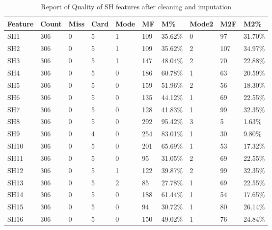 \documentclass[10pt,letterpaper,oneside]{article}
\begin{document}
	\begin{table}[ht]
		\centering
		\caption{Report of Quality of SH features after cleaning and imputation}
		\label{tab-report-of-quality-of-sh-features}
		\begin{tabular}{llllp{1.9cm}lllll}
			\hline
			\textbf{Feature} & \textbf{Count} & \textbf{Miss} & \textbf{Card} & \textbf{Mode}  & \textbf{MF} & \textbf{M\%} & \textbf{Mode2} & \textbf{M2F} & \textbf{M2\%} \\ \hline 
			SH1     & 306   & 0    & 5    & 1    & 109      & 35.62\%  & 0     & 97        & 31.70\%   \\ 
			SH2     & 306   & 0    & 5    & 1    & 109      & 35.62\%  & 2     & 107       & 34.97\%   \\ 
			SH3     & 306   & 0    & 5    & 1    & 147      & 48.04\%  & 2     & 70        & 22.88\%   \\ 
			SH4     & 306   & 0    & 5    & 0    & 186      & 60.78\%  & 1     & 63        & 20.59\%   \\ 
			SH5     & 306   & 0    & 5    & 0    & 159      & 51.96\%  & 2     & 56        & 18.30\%   \\ 
			SH6     & 306   & 0    & 5    & 0    & 135      & 44.12\%  & 1     & 69        & 22.55\%   \\ 
			SH7     & 306   & 0    & 5    & 0    & 128      & 41.83\%  & 1     & 99        & 32.35\%   \\ 
			SH8     & 306   & 0    & 5    & 0    & 292      & 95.42\%  & 3     & 5         & 1.63\%    \\ 
			SH9     & 306   & 0    & 4    & 0    & 254      & 83.01\%  & 1     & 30        & 9.80\%    \\ 
			SH10    & 306   & 0    & 5    & 0    & 201      & 65.69\%  & 1     & 53        & 17.32\%   \\ 
			SH11    & 306   & 0    & 5    & 0    & 95       & 31.05\%  & 2     & 69        & 22.55\%   \\ 
			SH12    & 306   & 0    & 5    & 1    & 122      & 39.87\%  & 2     & 99        & 32.35\%   \\ 
			SH13    & 306   & 0    & 5    & 2    & 85       & 27.78\%  & 1     & 69        & 22.55\%   \\ 
			SH14    & 306   & 0    & 5    & 0    & 188      & 61.44\%  & 1     & 54        & 17.65\%   \\ 
			SH15    & 306   & 0    & 5    & 0    & 94       & 30.72\%  & 1     & 80        & 26.14\%   \\ 
			SH16    & 306   & 0    & 5    & 0    & 150      & 49.02\%  & 1     & 76        & 24.84\%   \\ 

\end{tabular}
\end{table}
\end{document}
